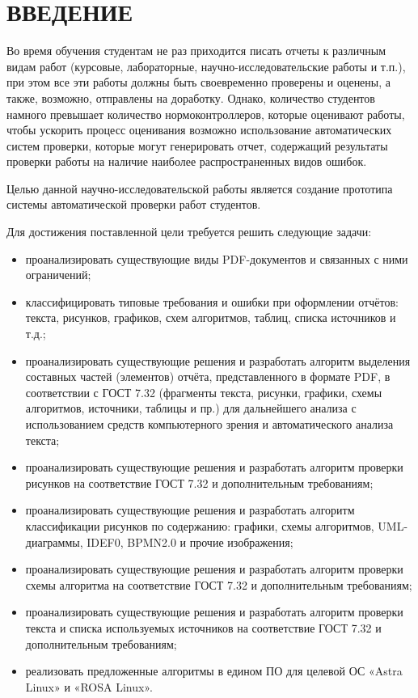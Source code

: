 \chapter*{ВВЕДЕНИЕ}

Во время обучения студентам не раз приходится писать отчеты к различным видам работ (курсовые, лабораторные, научно-исследовательские работы и т.п.), при этом все эти работы должны быть своевременно проверены и оценены, а также, возможно, отправлены на доработку. Однако, количество студентов намного превышает количество нормоконтроллеров, которые оценивают работы, чтобы ускорить процесс оценивания возможно использование автоматических систем проверки, которые могут генерировать отчет, содержащий результаты проверки работы на наличие наиболее распространенных видов ошибок.

Целью данной научно-исследовательской работы является создание прототипа системы автоматической проверки работ студентов.

Для достижения поставленной цели требуется решить следующие задачи:
\begin{itemize}
	\item проанализировать существующие виды PDF-документов и связанных с ними ограничений;
	\item классифицировать типовые требования и ошибки при оформлении отчётов: текста, рисунков, графиков, схем алгоритмов, таблиц, списка источников и т.д.;
	\item проанализировать существующие решения и разработать алгоритм выделения составных частей (элементов) отчёта, представленного в формате PDF, в соответствии с ГОСТ 7.32 (фрагменты текста, рисунки, графики, схемы алгоритмов, источники, таблицы и пр.) для дальнейшего анализа с использованием средств компьютерного зрения и автоматического анализа текста;
	\item проанализировать существующие решения и разработать алгоритм проверки рисунков на соответствие ГОСТ 7.32 и дополнительным требованиям;
	\item проанализировать существующие решения и разработать алгоритм классификации рисунков по содержанию: графики, схемы алгоритмов, UML-диаграммы, IDEF0, BPMN2.0 и прочие изображения;
	\item проанализировать существующие решения и разработать алгоритм проверки схемы алгоритма на соответствие ГОСТ 7.32 и дополнительным требованиям;
	\item проанализировать существующие решения и разработать алгоритм проверки текста и списка используемых источников на соответствие ГОСТ 7.32 и дополнительным требованиям;
	\item реализовать предложенные алгоритмы в едином ПО для целевой ОС «Astra Linux» и «ROSA Linux».
\end{itemize}
